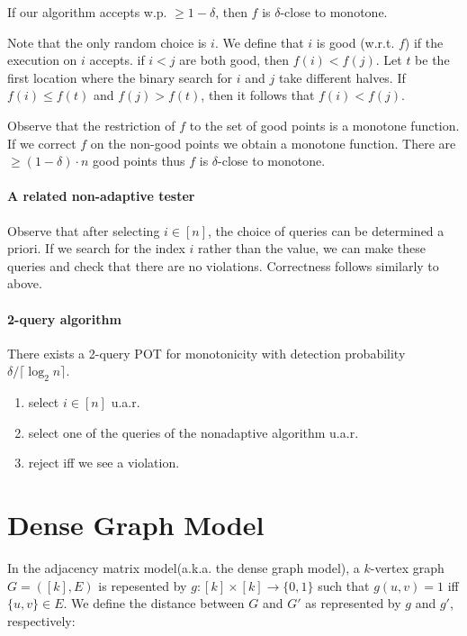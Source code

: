 \documentclass{idc_msc}
\begin{document}
If our algorithm accepts w.p. \(\ge 1 - \delta\), then \(f\) is \(\delta\)-close to monotone.

Note that the only random choice is \(i\).
We define that \(i\) is good (w.r.t. \(f\)) if the execution on \(i\) accepts.
if \(i < j\) are both good, then \(f(i) < f(j)\).
Let \(t\) be the first location where the binary search for \(i\) and \(j\) take different halves.
If \(f(i) \le f(t)\) and \(f(j) > f(t)\), then it follows that \(f(i) < f(j)\).

Observe that the restriction of \(f\) to the set of good points is a monotone function.
If we correct \(f\) on the non-good points we obtain a monotone function.
There are \(\ge (1 - \delta) \cdot n\) good points thus \(f\) is \(\delta\)-close to monotone.

\paragraph{A related non-adaptive tester}

Observe that after selecting \(i \in [n]\), the choice of queries can be determined a priori.
If we search for the index \(i\) rather than the value, we can make these queries and check that there are no violations.
Correctness follows similarly to above.

\paragraph{2-query algorithm}

There exists a 2-query POT for monotonicity with detection probability \(\delta / \lceil \log_2 n \rceil\).

\begin{enumerate}
  \item select \(i \in [n]\) u.a.r.
  \item select one of the queries of the nonadaptive algorithm u.a.r.
  \item reject iff we see a violation.
\end{enumerate}

\clearpage
\section{Dense Graph Model}


In the adjacency matrix model\footnotemark (a.k.a. the dense graph model), a \(k\)-vertex graph \(G = ([k], E)\) is repesented by \(g: [k] \times [k] \to \{0, 1\}\) such that \(g(u, v) = 1\) iff \(\{u,
v\} \in E\).
We define the distance between \(G\) and \(G'\) as represented by \(g\) and \(g'\), respectively:
\end{document}
